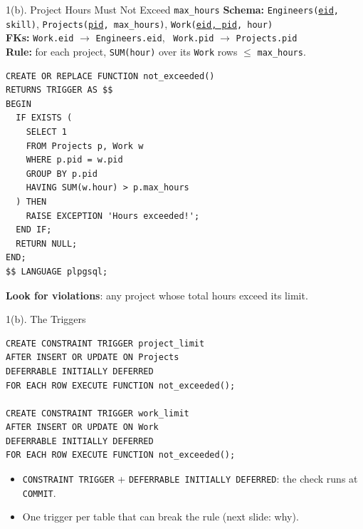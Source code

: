 \documentclass{beamer}
\begin{document}
\begin{frame}[fragile,shrink=4]{1(b). Project Hours Must Not Exceed \texttt{max\_hours}}
\footnotesize
{\scriptsize \textbf{Schema:} \texttt{Engineers(\underline{eid}, skill)}, \texttt{Projects(\underline{pid}, max\_hours)}, \texttt{Work(\underline{eid, pid}, hour)}\\
\textbf{FKs:} \texttt{Work.eid} $\to$ \texttt{Engineers.eid}, \ \texttt{Work.pid} $\to$ \texttt{Projects.pid}\\
\textbf{Rule:} for each project, \texttt{SUM(hour)} over its \texttt{Work} rows $\le$ \texttt{max\_hours}.}
\begin{lstlisting}[language=plpgsql]
CREATE OR REPLACE FUNCTION not_exceeded()
RETURNS TRIGGER AS $$
BEGIN
  IF EXISTS (
    SELECT 1
    FROM Projects p, Work w
    WHERE p.pid = w.pid
    GROUP BY p.pid
    HAVING SUM(w.hour) > p.max_hours
  ) THEN
    RAISE EXCEPTION 'Hours exceeded!';
  END IF;
  RETURN NULL;
END;
$$ LANGUAGE plpgsql;
\end{lstlisting}
\textbf{Look for violations}: any project whose total hours exceed its limit.
\end{frame}

\begin{frame}[fragile]{1(b). The Triggers}
\small
\begin{lstlisting}[language=plpgsql]
CREATE CONSTRAINT TRIGGER project_limit
AFTER INSERT OR UPDATE ON Projects
DEFERRABLE INITIALLY DEFERRED
FOR EACH ROW EXECUTE FUNCTION not_exceeded();

CREATE CONSTRAINT TRIGGER work_limit
AFTER INSERT OR UPDATE ON Work
DEFERRABLE INITIALLY DEFERRED
FOR EACH ROW EXECUTE FUNCTION not_exceeded();
\end{lstlisting}
\begin{itemize}
  \item \texttt{CONSTRAINT TRIGGER} + \texttt{DEFERRABLE INITIALLY DEFERRED}: the check runs at \texttt{COMMIT}.
  \item One trigger per table that can break the rule (next slide: why).
\end{itemize}
\end{frame}
\end{document}

